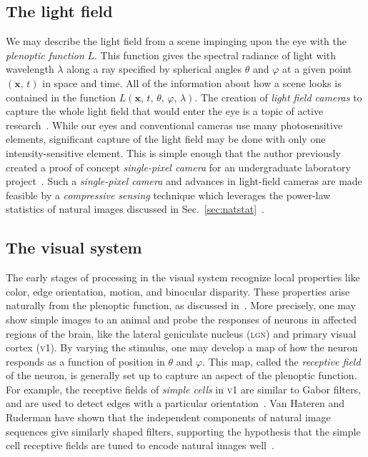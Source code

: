 \documentclass[aps,reprint,floatfix]{revtex4-2}
\theoremstyle{plain}
\theoremstyle{definition}
\renewcommand\phi\varphi%
\begin{document}
\subsection{The light field}\label{sec:light-field}

We may describe the light field from a scene impinging upon the eye with the
\emph{plenoptic function} $L$. This function gives the spectral radiance of
light with wavelength $\lambda$ along a ray specified by spherical angles
$\theta$ and $\phi$ at a given point $(\bm{x},\, t)$ in space and time. All of
the information about how a scene looks is contained in the function
$L(\bm{x},\, t,\, \theta,\, \phi,\, \lambda)$. The creation of \emph{light field
cameras} to capture the whole light field that would enter the eye is a topic
of active research~\cite{light-field}. While our eyes and conventional cameras
use many photosensitive elements, significant capture of the light field may be
done with only one intensity-sensitive element. This is simple enough that the
author previously created a proof of concept \emph{single-pixel camera} for an
undergraduate laboratory project~\cite{csjlab,single-pixel}. Such a
\emph{single-pixel camera} and advances in light-field cameras are made feasible
by a \emph{compressive sensing} technique which leverages the power-law
statistics of natural images discussed in
Sec.~\ref{sec:natstat}~\cite{compressed-sensing}.

\subsection{The visual system}\label{sec:visual-system}

The early stages of processing in the visual system recognize local properties
like color, edge orientation, motion, and binocular disparity. These properties
arise naturally from the plenoptic function, as discussed in~\cite{plenoptic}.
More precisely, one may show simple images to an animal and probe the responses
of neurons in affected regions of the brain, like the lateral geniculate nucleus
(\textsc{lgn}) and primary visual cortex (\textsc{v1}). By varying the stimulus,
one may develop a map of how the neuron responds as a function of position in
$\theta$ and $\phi$. This map, called the \emph{receptive field} of the neuron,
is generally set up to capture an aspect of the plenoptic function. For example,
the receptive fields of \emph{simple cells} in \textsc{v1} are similar to Gabor
filters, and are used to detect edges with a particular
orientation~\cite{plenoptic}. Van Hateren and Ruderman have shown that the
independent components of natural image sequences give similarly shaped filters,
supporting the hypothesis that the simple cell receptive fields are tuned to
encode natural images well~\cite{strf}.
\end{document}

